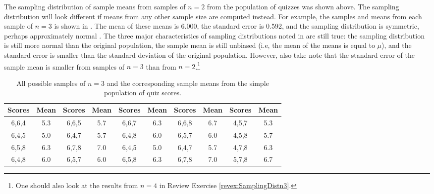 \documentclass[10pt,openany]{book}\usepackage[]{graphicx}\usepackage[]{color}
\begin{document}
The sampling distribution of sample means from samples of $n=2$ from the population of quizzes was shown above.  The sampling distribution will look different if means from any other sample size are computed instead.  For example, the samples and means from each sample of $n=3$ is shown in .  The mean of these means is 6.000, the standard error is 0.592, and the sampling distribution is symmetric, perhaps approximately normal .  The three major characteristics of sampling distributions noted in  are still true: the sampling distribution is still more normal than the original population, the sample mean is still unbiased (i.e, the mean of the means is equal to $\mu$), and the standard error is smaller than the standard deviation of the original population.  However, also take note that the standard error of the sample mean is smaller from samples of $n=3$ than from $n=2$.\footnote{One should also look at the results from $n=4$ in Review Exercise \ref{revex:SamplingDistn3}.}

\begin{table}[htbp]
  \caption{All possible samples of $n=3$ and the corresponding sample means from the simple population of quiz scores.}
  \label{tab:SDistQuiz3}
  \centering
    \begin{tabular}{cc||cc||cc||cc||cc}
\hline\hline
Scores & Mean & Scores & Mean & Scores &  Mean & Scores & Mean & Scores & Mean \\
\hline
6,6,4 & 5.3 & 6,6,5 & 5.7 & 6,6,7 & 6.3 & 6,6,8 & 6.7 & 4,5,7 & 5.3 \\
6,4,5 & 5.0 & 6,4,7 & 5.7 & 6,4,8 & 6.0 & 6,5,7 & 6.0 & 4,5,8 & 5.7 \\
6,5,8 & 6.3 & 6,7,8 & 7.0 & 6,4,5 & 5.0 & 6,4,7 & 5.7 & 4,7,8 & 6.3 \\
6,4,8 & 6.0 & 6,5,7 & 6.0 & 6,5,8 & 6.3 & 6,7,8 & 7.0 & 5,7,8 & 6.7 \\
\hline\hline
    \end{tabular}
\end{table}
\end{document}
